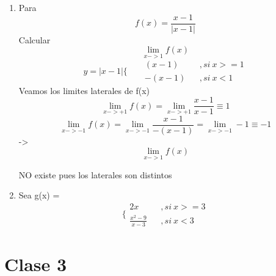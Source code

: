 \documentclass{article}
\begin{document}
            \begin{enumerate}
                \item Para \begin{equation}
                    f(x) = \frac{x-1}{|x-1|}
                \end{equation} Calcular
                \begin{equation}
                    \lim_{x->1} f(x)
                \end{equation} 
                \begin{equation}
                    y=|x-1| \Biggl\{ 
                    \begin{aligned}
                          && (x-1) && ,si\ x>=1 \\ 
                          &&-(x-1) &&,si\ x<1
                    \end{aligned}
                \end{equation} Veamos los limites laterales de f(x)
                \begin{equation}
                    \lim_{x->+1}f(x)=\lim_{x->+1} \frac{x-1}{x-1} \equiv 1
                \end{equation}
                \begin{equation}
                    \lim_{x->-1}f(x)=\lim_{x->-1} \frac{x-1}{-(x-1)} = \lim_{x->-1} -1 \equiv -1
                \end{equation}
                -> \begin{equation}
                    \lim_{x->1} f(x)
                \end{equation} \begin{center}
                    NO existe pues los laterales son distintos
                \end{center}
                \item Sea g(x) = \begin{equation}
                    \biggl\{\begin{aligned}
                        2x && ,si\ x>=3 \\ 
                        \frac{x^2 -9}{x-3} &&,si\ x<3 
                    \end{aligned}
                \end{equation}
            \end{enumerate}
    \section{Clase 3}
    
\end{document}
